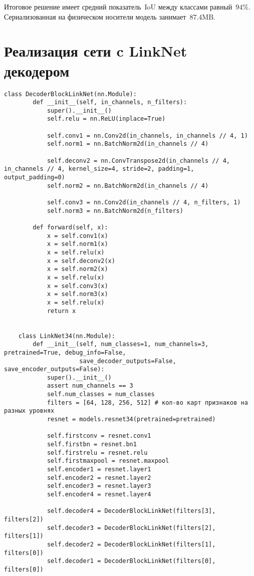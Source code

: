 Итоговое решение имеет средний показатель~$\mathrm{IoU}$ между классами равный~$94\%$.
Сериализованная на физическом носители модель занимает~$87.4\mathrm{MB}$.

\appendix

\section{Реализация сети c LinkNet декодером}

\begin{lstlisting}[python]
    class DecoderBlockLinkNet(nn.Module):
        def __init__(self, in_channels, n_filters):
            super().__init__()
            self.relu = nn.ReLU(inplace=True)

            self.conv1 = nn.Conv2d(in_channels, in_channels // 4, 1)
            self.norm1 = nn.BatchNorm2d(in_channels // 4)

            self.deconv2 = nn.ConvTranspose2d(in_channels // 4, in_channels // 4, kernel_size=4, stride=2, padding=1, output_padding=0)
            self.norm2 = nn.BatchNorm2d(in_channels // 4)

            self.conv3 = nn.Conv2d(in_channels // 4, n_filters, 1)
            self.norm3 = nn.BatchNorm2d(n_filters)

        def forward(self, x):
            x = self.conv1(x)
            x = self.norm1(x)
            x = self.relu(x)
            x = self.deconv2(x)
            x = self.norm2(x)
            x = self.relu(x)
            x = self.conv3(x)
            x = self.norm3(x)
            x = self.relu(x)
            return x


    class LinkNet34(nn.Module):
        def __init__(self, num_classes=1, num_channels=3, pretrained=True, debug_info=False,
                     save_decoder_outputs=False, save_encoder_outputs=False):
            super().__init__()
            assert num_channels == 3
            self.num_classes = num_classes
            filters = [64, 128, 256, 512] # кол-во карт признаков на разных уровнях
            resnet = models.resnet34(pretrained=pretrained)

            self.firstconv = resnet.conv1
            self.firstbn = resnet.bn1
            self.firstrelu = resnet.relu
            self.firstmaxpool = resnet.maxpool
            self.encoder1 = resnet.layer1
            self.encoder2 = resnet.layer2
            self.encoder3 = resnet.layer3
            self.encoder4 = resnet.layer4

            self.decoder4 = DecoderBlockLinkNet(filters[3], filters[2])
            self.decoder3 = DecoderBlockLinkNet(filters[2], filters[1])
            self.decoder2 = DecoderBlockLinkNet(filters[1], filters[0])
            self.decoder1 = DecoderBlockLinkNet(filters[0], filters[0])


\end{lstlisting}
